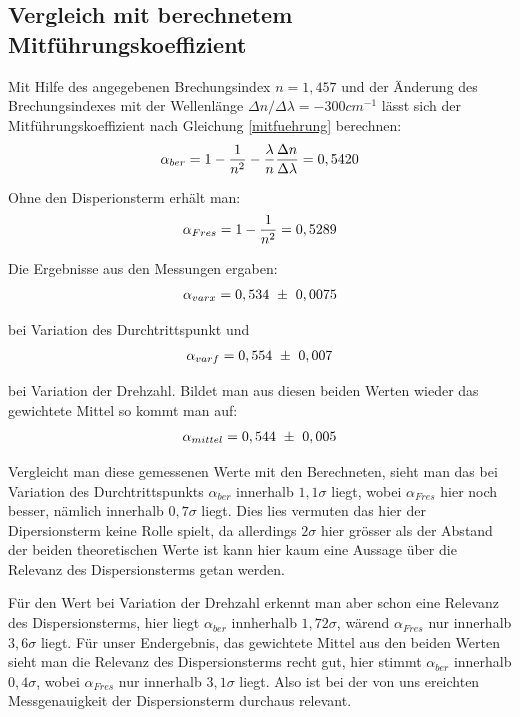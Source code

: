 \documentclass[12pt]{article}
\begin{document}
\subsection{Vergleich mit berechnetem Mitführungskoeffizient}
Mit Hilfe des angegebenen Brechungsindex $n=1,457$ und der Änderung des Brechungsindexes mit der Wellenlänge $\Delta n / \Delta\lambda = -300 cm^{-1}$
lässt sich der Mitführungskoeffizient nach Gleichung \ref{mitfuehrung} berechnen:
\begin{align}
\notag
 \alpha_{ber} = 1 - \frac{1}{n^2} - \frac{\lambda}{n} \frac{\Delta n}{\Delta \lambda} = 0,5420
\end{align}

Ohne den Disperionsterm erhält man:
\begin{align}
\notag
 \alpha_{Fres} = 1 - \frac{1}{n^2} = 0,5289
\end{align}

Die Ergebnisse aus den Messungen ergaben:
\begin{align}
\notag
 \alpha_{varx} = 0,534 \ \pm \ 0,0075
\end{align}

bei Variation des Durchtrittspunkt und
\begin{align}
\notag
 \alpha_{varf} = 0,554 \ \pm \ 0,007
\end{align}

bei Variation der Drehzahl. Bildet man aus diesen beiden Werten wieder das gewichtete Mittel so kommt man auf:
\begin{align}
\notag
 \alpha_{mittel} = 0,544 \ \pm \ 0,005
\end{align}

Vergleicht man diese gemessenen Werte mit den Berechneten, sieht man das bei Variation des Durch\-trittspunkts $\alpha_{ber}$ innerhalb $1,1\sigma$ liegt, wobei  $\alpha_{Fres}$ hier noch besser, nämlich innerhalb $0,7\sigma$ liegt. Dies lies vermuten das hier der Dipersionsterm keine Rolle spielt, da allerdings $2\sigma$ hier grösser als der Abstand der beiden theoretischen Werte ist kann hier kaum eine Aussage über die Relevanz des Dispersionsterms getan werden.

Für den Wert bei Variation der Drehzahl erkennt man aber schon eine Relevanz des Dispersionsterms, hier liegt $\alpha_{ber}$ innherhalb $1,72\sigma$, wärend $\alpha_{Fres}$ nur innerhalb $3,6\sigma$ liegt. Für unser Endergebnis, das gewichtete Mittel aus den beiden Werten sieht man die Relevanz des Dispersionsterms recht gut, hier stimmt $\alpha_{ber}$ innerhalb $0,4\sigma$, wobei $\alpha_{Fres}$ nur innerhalb $3,1\sigma$ liegt. Also ist bei der von uns ereichten Messgenauigkeit der Dispersionsterm durchaus relevant.
\end{document}
